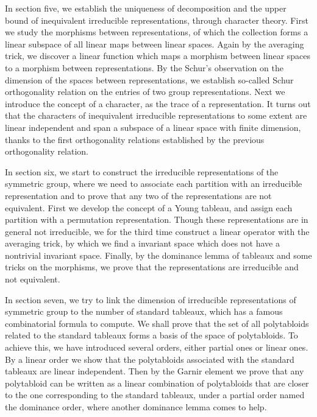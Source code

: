 \documentclass{assignment}[2019/10/15]
\theoremstyle{plain}
\numberwithin{equation}{section}
\begin{document}
    In section five, we establish the uniqueness of decomposition and the upper bound of inequivalent irreducible representations, through character theory. First we study the morphisms between representations, of which the collection forms a linear subspace of all linear maps between linear spaces. Again by the averaging trick, we discover a linear function which maps a morphism between linear spaces to a morphism between representations. By the Schur's observation on the dimension of the spaces between representations, we establish so-called Schur orthogonality relation on the entries of two group representations. Next we introduce the concept of a character, as the trace of a representation. It turns out that the characters of inequivalent irreducible representations to some extent are linear independent and span a subspace of a linear space with finite dimension, thanks to the first orthogonality relations established by the previous orthogonality relation.

    In section six, we start to construct the irreducible representations of the symmetric group, where we need to associate each partition with an irreducible representation and to prove that any two of the representations are not equivalent. First we develop the concept of a Young tableau, and assign each partition with a permutation representation. Though these representations are in general not irreducible, we for the third time construct a linear operator with the averaging trick, by which we find a invariant space which does not have a nontrivial invariant space. Finally, by the dominance lemma of tableaux and some tricks on the morphisms, we prove that the representations are irreducible and not equivalent.

    In section seven, we try to link the dimension of irreducible representations of symmetric group to the number of standard tableaux, which has a famous combinatorial formula to compute. We shall prove that the set of all polytabloids related to the standard tableaux forms a basis of the space of polytabloids. To achieve this, we have introduced several orders, either partial ones or linear ones. By a linear order we show that the polytabloids associated with the standard tableaux are linear independent. Then by the Garnir element we prove that any polytabloid can be written as a linear combination of polytabloids that are closer to the one corresponding to the standard tableaux, under a partial order named the dominance order, where another dominance lemma comes to help.
\end{document}

